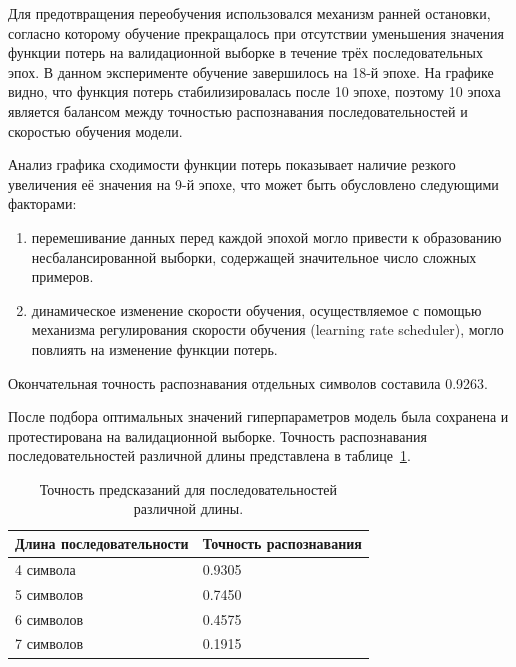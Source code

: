 \documentclass{altsu-report}
\begin{document}
\vspace{-0.7cm}

Для предотвращения переобучения использовался механизм ранней остановки, согласно которому обучение прекращалось при отсутствии уменьшения значения функции потерь на валидационной выборке в течение трёх последовательных эпох. В данном эксперименте обучение завершилось на 18-й эпохе. На графике видно, что функция потерь стабилизировалась после 10 эпохе, поэтому 10 эпоха является балансом между точностью распознавания последовательностей и скоростью обучения модели.

Анализ графика сходимости функции потерь показывает наличие резкого увеличения её значения на 9-й эпохе, что может быть обусловлено следующими факторами:

\begin{enumerate}
    \item перемешивание данных перед каждой эпохой могло привести к образованию несбалансированной выборки, содержащей значительное число сложных примеров.
    \item динамическое изменение скорости обучения, осуществляемое с помощью механизма регулирования скорости обучения (learning rate scheduler), могло повлиять на изменение функции потерь.
\end{enumerate}

Окончательная точность распознавания отдельных символов составила 0.9263.

После подбора оптимальных значений гиперпараметров модель была сохранена и протестирована на валидационной выборке. Точность распознавания последовательностей различной длины представлена в таблице~\ref{tab:probability}.

\begin{table}[H]
    \centering
    \caption{Точность предсказаний для последовательностей различной длины.}
    \begin{tabular}{|l|l|}
        \hline
        Длина последовательности & Точность распознавания \\
        \hline
        4 символа & 0.9305 \\
        \hline
        5 символов & 0.7450 \\
        \hline
        6 символов & 0.4575 \\
        \hline
        7 символов & 0.1915 \\
        \hline
    \end{tabular}
    \label{tab:probability}
\end{table}
\end{document}
